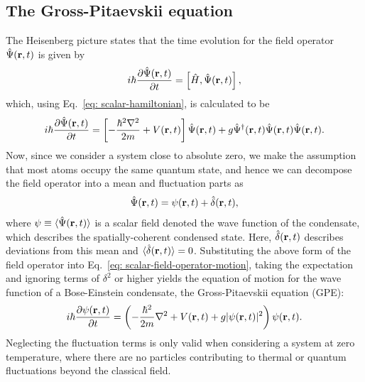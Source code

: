 \subsection{The Gross-Pitaevskii equation}
The Heisenberg picture states that the time evolution for the field operator
\(\hat{\Psi}(\vb{r}, t)\) is given by~\cite{Pethick2008}
\begin{align}
    i\hbar\pdv{\hat{\Psi}(\vb{r}, t)}{t} = \left[\hat{H}, \hat{\Psi}(\vb{r}, t)
    \right],
\end{align}
which, using Eq.~\eqref{eq: scalar-hamiltonian}, is calculated to be
\begin{align}\label{eq: scalar-field-operator-motion}
    i\hbar\pdv{\hat{\Psi}(\vb{r}, t)}{t} = \left[-\frac{\hbar^2\nabla^2}{2m}
    + V(\vb{r}, t)\right]\hat{\Psi}(\vb{r}, t)
    + g\hat{\Psi}^\dagger(\vb{r}, t)\hat{\Psi}(\vb{r}, t)\hat{\Psi}(\vb{r}, t).
\end{align}
Now, since we consider a system close to absolute zero, we make the assumption
that most atoms occupy the same quantum state, and hence we can decompose the
field operator into a mean and fluctuation parts as
\begin{align}
    \hat{\Psi}(\vb{r}, t) = \psi(\vb{r}, t) + \hat{\delta}(\vb{r}, t),
\end{align}
where \(\psi \equiv \langle \hat{\Psi}(\vb{r}, t)\rangle\) is a scalar field
denoted the wave function of the condensate, which describes the
spatially-coherent condensed state.
Here, \(\hat{\delta}(\vb{r}, t)\) describes deviations from this mean and
\(\langle \hat{\delta}(\vb{r}, t)\rangle = 0\).
Substituting the above form of the field operator into
Eq.~\eqref{eq: scalar-field-operator-motion}, taking the expectation and
ignoring terms of \(\delta^2\) or higher yields the equation of motion for the
wave function of a Bose-Einstein condensate, the Gross-Pitaevskii equation
(GPE):
\begin{equation}\label{eq: scalar-GPE}
    i\hbar \pdv{\psi(\vb{r}, t)}{t} = \left(-\frac{\hbar^2}{2m}\nabla^2
    + V(\vb{r}, t) +g|\psi(\vb{r}, t)|^2\right)\psi(\vb{r}, t).
\end{equation}
Neglecting the fluctuation terms is only valid when considering a system at zero
temperature, where there are no particles contributing to thermal or quantum
fluctuations beyond the classical field.

